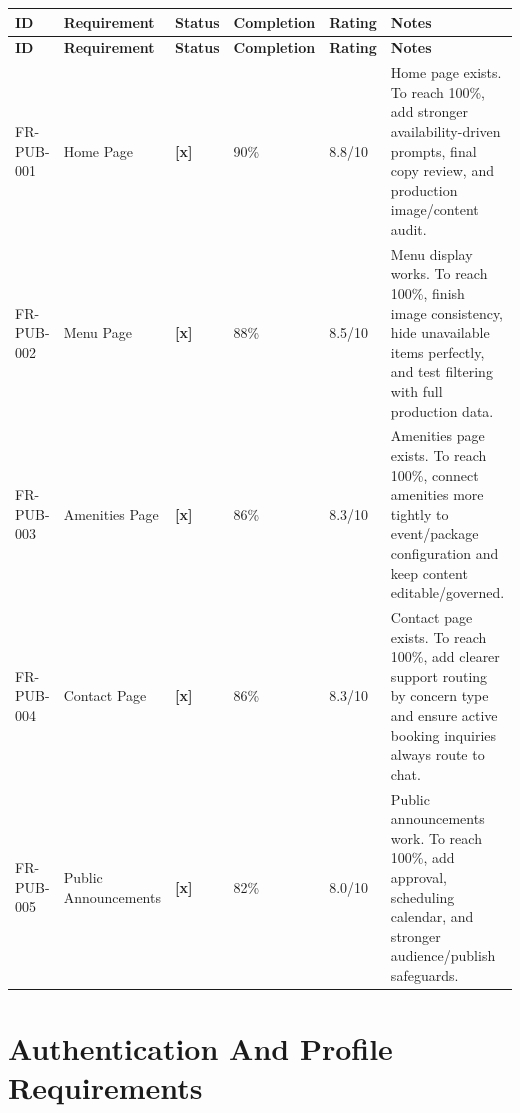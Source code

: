 \documentclass[11pt,a4paper]{article}
\newcommand{\statusdone}{\textbf{[x]}}
\begin{document}
\begin{longtable}{L{0.15\textwidth} L{0.22\textwidth} C{0.08\textwidth} C{0.10\textwidth} C{0.10\textwidth} L{0.25\textwidth}}
\toprule
\textbf{ID} & \textbf{Requirement} & \textbf{Status} & \textbf{Completion} & \textbf{Rating} & \textbf{Notes} \\
\midrule
\endfirsthead
\toprule
\textbf{ID} & \textbf{Requirement} & \textbf{Status} & \textbf{Completion} & \textbf{Rating} & \textbf{Notes} \\
\midrule
\endhead
FR-PUB-001 & Home Page & \statusdone & 90\% & 8.8/10 & Home page exists. To reach 100\%, add stronger availability-driven prompts, final copy review, and production image/content audit. \\
FR-PUB-002 & Menu Page & \statusdone & 88\% & 8.5/10 & Menu display works. To reach 100\%, finish image consistency, hide unavailable items perfectly, and test filtering with full production data. \\
FR-PUB-003 & Amenities Page & \statusdone & 86\% & 8.3/10 & Amenities page exists. To reach 100\%, connect amenities more tightly to event/package configuration and keep content editable/governed. \\
FR-PUB-004 & Contact Page & \statusdone & 86\% & 8.3/10 & Contact page exists. To reach 100\%, add clearer support routing by concern type and ensure active booking inquiries always route to chat. \\
FR-PUB-005 & Public Announcements & \statusdone & 82\% & 8.0/10 & Public announcements work. To reach 100\%, add approval, scheduling calendar, and stronger audience/publish safeguards. \\
\bottomrule
\end{longtable}

\section{Authentication And Profile Requirements}
\end{document}
